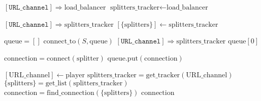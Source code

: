 \documentclass{article}
\begin{document}
\pagestyle{empty}

\newcommand{\send}{\Rightarrow}
\newcommand{\sendto}{\rightarrow}
\algrenewcommand{}
\algrenewcommand\textproc{\textrm}

\begin{algorithmic}

  \State $[\mathtt{URL\_channel}] \send \text{load\_balancer}$
  \State \Return $\text{splitters\_tracker} \gets \text{load\_balancer}$
  \EndFunction
  
  \State $[\mathtt{URL\_channel}] \send \text{splitters\_tracker}$
  \State \Return $[\{\mathrm{splitters}\}] \gets \mathrm{splitters\_tracker}$
  \EndFunction

  \State $\mathrm{queue}=[]$
  \State $\text{connect\_to}(S, \text{queue})$
  \EndFor 
  \State $[\mathtt{URL\_channel}] \send \text{splitters\_tracker}$
  \State \Return $\mathrm{queue}[0]$
  \EndFunction

  \algrenewcommand{}

  \State $\text{connection} = \mathrm{connect}(\text{splitter})$
  \State $\text{queue}.\text{put}(\text{connection})$
  \EndIf
  \EndFunction

  \algrenewcommand{}
  
  \State $[\text{URL\_channel}] \gets \text{player}$
  \State $\text{splitters\_tracker} = \text{get\_tracker}(\text{URL\_channel})$
  \State $\{\text{splitters}\} = \text{get\_list}(\text{splitters\_tracker})$
  \State $\text{connection} = \text{find\_connection}(\{\text{splitters}\})$
  \State \Return $\text{connection}$
  \EndFunction
  \EndProcedure

\end{algorithmic}
\end{document}
